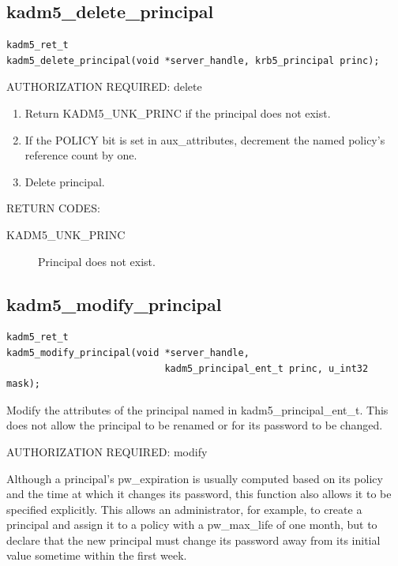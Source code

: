 \subsection{kadm5_delete_principal}

\begin{verbatim}
kadm5_ret_t
kadm5_delete_principal(void *server_handle, krb5_principal princ);
\end{verbatim}

AUTHORIZATION REQUIRED: delete

\begin{enumerate}
\item Return KADM5_UNK_PRINC if the principal does not exist.
\item If the POLICY bit is set in aux_attributes, decrement the named
policy's reference count by one.
\item Delete principal.
\end{enumerate}

RETURN CODES:

\begin{description}
\item[KADM5_UNK_PRINC] Principal does not exist.
\end{description}

\subsection{kadm5_modify_principal}

\begin{verbatim}
kadm5_ret_t
kadm5_modify_principal(void *server_handle,
                            kadm5_principal_ent_t princ, u_int32 mask);
\end{verbatim}

Modify the attributes of the principal named in
kadm5_principal_ent_t. This does not allow the principal to be
renamed or for its password to be changed.

AUTHORIZATION REQUIRED: modify

Although a principal's pw_expiration is usually computed based on its
policy and the time at which it changes its password, this function
also allows it to be specified explicitly.  This allows an
administrator, for example, to create a principal and assign it to a
policy with a pw_max_life of one month, but to declare that the new
principal must change its password away from its initial value
sometime within the first week.

